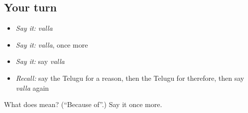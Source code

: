 \subsection*{Your turn}
\begin{itemize}
\raggedright
  \item \emph{Say it:} \emph{valla}
  \item \emph{Say it:} \emph{valla}, once more
  \item \emph{Say it:} say \emph{valla}
  \item \emph{Recall:} say the Telugu for a reason, then the Telugu for therefore, then say \emph{valla} again
\end{itemize}

\begin{tcolorbox}[breakable,colback=teal!4,colframe=teal!35!black,title={Before you move on}]
What does  mean? (\textquotedblleft{}Because of\textquotedblright{}.) Say it once more.
\end{tcolorbox}
